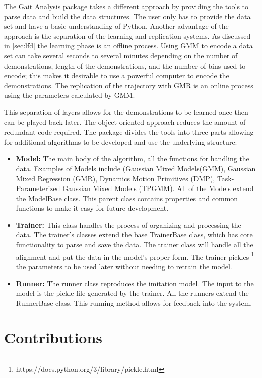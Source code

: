 The Gait Analysis package takes a different approach by providing the tools to parse data and build the data structures. The user only has to provide the data set and have a basic understanding of Python. Another advantage of the approach is the separation of the learning and replication systems. As discussed in \autoref{sec:lfd} the learning phase is an offline process. Using GMM to encode a data set can take several seconds to several minutes depending on the number of demonstrations, length of the demonstrations, and the number of bins used to encode; this makes it desirable to use a powerful computer to encode the demonstrations. The replication of the trajectory with GMR is an online process using the parameters calculated by GMM. 

This separation of layers allows for the demonstrations to be learned once then can be played back later. The object-oriented approach reduces the amount of redundant code required. The package divides the tools into three parts allowing for additional algorithms to be developed and use the underlying structure: 

\begin{itemize}[noitemsep]
    \item \textbf{Model:} The main body of the algorithm, all the functions for handling the data. Examples of Models include (Gaussian Mixed Models(GMM), Gaussian Mixed Regression (GMR), Dynamics Motion Primitives (DMP), Task-Parameterized Gaussian Mixed Models (TPGMM). All of the Models extend the ModelBase class. This parent class contains properties and common functions to make it easy for future development.
    \item \textbf{Trainer:} This class handles the process of organizing and processing the data. The trainer's classes extend the base TrainerBase class, which has core functionality to parse and save the data. The trainer class will handle all the alignment and put the data in the model's proper form. The trainer pickles \footnote{https://docs.python.org/3/library/pickle.html} the parameters to be used later without needing to retrain the model. 
    \item \textbf{Runner:} The runner class reproduces the imitation model. The input to the model is the pickle file generated by the trainer. All the runners extend the RunnerBase class. This running method allows for feedback into the system. 
\end{itemize}


\section{Contributions}


